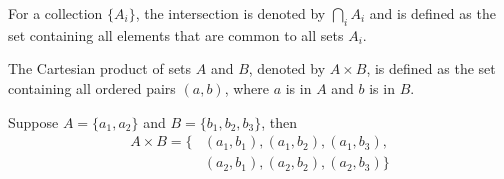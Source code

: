 \begin{definition}
	For a collection $\{A_i\}$, the intersection is denoted by $\bigcap_{i} A_i$ and is defined as the set containing all elements that are common to all sets $A_i$.
\end{definition}

\begin{definition}
	The Cartesian product of sets $A$ and $B$, denoted by $A \times B$, is defined as the set containing all ordered pairs $(a, b)$, where $a$ is in $A$ and $b$ is in $B$.
\end{definition}

\begin{example}
	Suppose $A= \{a_1,a_2\}$ and $B=\{b_1,b_2,b_3\}$, then
	\begin{equation}
		\begin{split}
			A\times B = \{&(a_1,b_1),(a_1,b_2),(a_1,b_3),\\
			&(a_2,b_1),(a_2,b_2),(a_2,b_3)\}
		\end{split}
	\end{equation}
\end{example}

	
